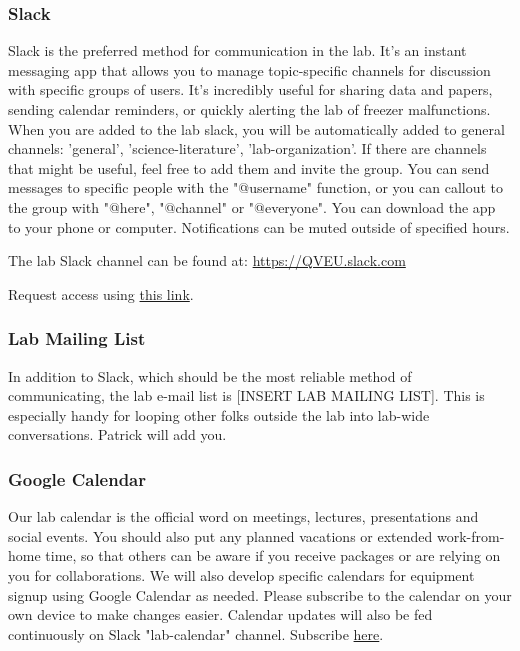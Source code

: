 \documentclass[10pt, letterpaper, twocolumn]{article} %
\begin{document}
\subsubsection{Slack}
Slack is the preferred method for communication in the lab. It's an instant messaging app that allows you to manage topic-specific channels for discussion with specific groups of users. It’s incredibly useful for sharing data and papers, sending calendar reminders, or quickly alerting the lab of freezer malfunctions. When you are added to the lab slack, you will be automatically added to general channels: 'general', 'science-literature', 'lab-organization'. If there are channels that might be useful, feel free to add them and invite the group. You can send messages to specific people with the "@username" function, or you can callout to the group with "@here", "@channel" or "@everyone". You can download the app to your phone or computer. Notifications can be muted outside of specified hours.

The lab Slack channel can be found at: \href{https://QVEU.slack.com}{https://QVEU.slack.com}\newline

Request access using \href{https://join.slack.com/t/qveu/shared_invite/zt-sspu46d0-mJUV8OjwjOoJTaFyPKGlZg}{this link}.\newline


\subsubsection{Lab Mailing List}
In addition to Slack, which should be the most reliable method of communicating, the lab e-mail list is [INSERT LAB MAILING LIST]. This is especially handy for looping other folks outside the lab into lab-wide conversations. Patrick will add you.

\subsubsection{Google Calendar}
Our lab calendar is the official word on meetings, lectures, presentations and social events. You should also put any planned vacations or extended work-from-home time, so that others can be aware if you receive packages or are relying on you for collaborations. We will also develop specific calendars for equipment signup using Google Calendar as needed. Please subscribe to the calendar on your own device to make changes easier. Calendar updates will also be fed continuously on Slack "lab-calendar" channel. Subscribe \href{https://calendar.google.com/calendar/u/0?cid=dGhlcXZldUBnbWFpbC5jb20z}{here}.
\end{document}
